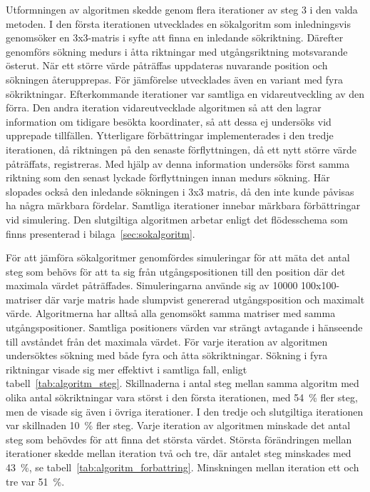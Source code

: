         Utformningen av algoritmen skedde genom flera iterationer av steg 3 i den valda metoden. I den första iterationen utvecklades en sökalgoritm som inledningsvis genomsöker en 3x3-matris i syfte att finna en inledande sökriktning. Därefter genomförs sökning medurs i åtta riktningar med utgångsriktning motsvarande österut. När ett större värde påträffas uppdateras nuvarande position och sökningen återupprepas. För jämförelse utvecklades även en variant med fyra sökriktningar. Efterkommande iterationer var samtliga en vidareutveckling av den förra. Den andra iteration vidareutvecklade algoritmen så att den lagrar information om tidigare besökta koordinater, så att dessa ej undersöks vid upprepade tillfällen. Ytterligare förbättringar implementerades i den tredje iterationen, då riktningen på den senaste förflyttningen, då ett nytt större värde påträffats, registreras. Med hjälp av denna information undersöks först samma riktning som den senast lyckade förflyttningen innan medurs sökning. Här slopades också den inledande sökningen i 3x3 matris, då den inte kunde påvisas ha några märkbara fördelar. Samtliga iterationer innebar märkbara förbättringar vid simulering. Den slutgiltiga algoritmen arbetar enligt det flödesschema som finns presenterad i bilaga~\ref{sec:sokalgoritm}. \bigskip

        För att jämföra sökalgoritmer genomfördes simuleringar för att mäta det antal steg som behövs för att ta sig från utgångspositionen till den position där det maximala värdet påträffades. Simuleringarna använde sig av 10000 100x100-matriser där varje matris hade slumpvist genererad utgångsposition och maximalt värde. Algoritmerna har alltså alla genomsökt samma matriser med samma utgångspositioner. Samtliga positioners värden var strängt avtagande i hänseende till avståndet från det maximala värdet. För varje iteration av algoritmen undersöktes sökning med både fyra och åtta sökriktningar. Sökning i fyra riktningar visade sig mer effektivt i samtliga fall, enligt tabell~\ref{tab:algoritm_steg}. Skillnaderna i antal steg mellan samma algoritm med olika antal sökriktningar vara störst i den första iterationen, med 54~\% fler steg, men de visade sig även i övriga iterationer. I den tredje och slutgiltiga iterationen var skillnaden 10~\% fler steg. Varje iteration av algoritmen minskade det antal steg som behövdes för att finna det största värdet. Största förändringen mellan iterationer skedde mellan iteration två och tre, där antalet steg minskades med 43~\%, se tabell~\ref{tab:algoritm_forbattring}. Minskningen mellan iteration ett och tre var 51~\%. \bigskip

